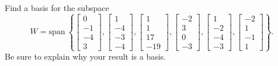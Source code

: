 \documentclass{article}
\begin{document}
\begin{exerciseStatement}
    Find a basis for the subspace
\[W=\mathrm{span}\ \left\{\left[\begin{array}{r}
0 \\
-1 \\
-4 \\
3
\end{array}\right] , \left[\begin{array}{r}
1 \\
-4 \\
-3 \\
-4
\end{array}\right] , \left[\begin{array}{r}
1 \\
1 \\
17 \\
-19
\end{array}\right] , \left[\begin{array}{r}
-2 \\
3 \\
0 \\
-3
\end{array}\right] , \left[\begin{array}{r}
1 \\
-2 \\
-4 \\
-3
\end{array}\right] , \left[\begin{array}{r}
-2 \\
1 \\
-1 \\
1
\end{array}\right]\right\}.\]
 Be sure to explain why your result is a basis.


  
\end{exerciseStatement}
\end{document}

